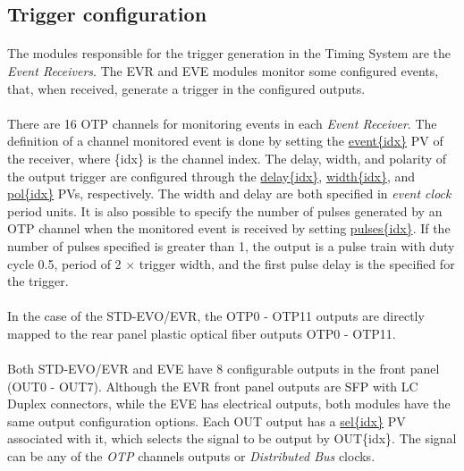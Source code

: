 \documentclass[openany]{article}
\begin{document}
	\subsection{Trigger configuration}
		\paragraph{} The modules responsible for the trigger generation in the Timing System are the \emph{Event 
Receivers}. The EVR and EVE modules monitor some configured events, that, when received, generate a trigger in the configured outputs.
		\paragraph{} There are 16 OTP channels for monitoring events in each \emph{Event Receiver}. The definition of a channel monitored event is done by setting the \hyperref[pvgroup:evre-otp]{event\{idx\}} PV of the receiver, where \{idx\} is the channel index. The delay, width, and polarity of the output trigger are configured through the \hyperref[pvgroup:evre-otp]{delay\{idx\}}, \hyperref[pvgroup:evre-otp]{width\{idx\}}, and \hyperref[pvgroup:evre-otp]{pol\{idx\}} PVs, respectively. The width and delay are both specified in \emph{event clock} period units. It is also possible to specify the number of pulses generated by an OTP channel when the monitored event is received by setting \hyperref[pvgroup:evre-otp]{pulses\{idx\}}. If the number of pulses specified is greater than 1, the output is a pulse train with duty cycle 0.5, period of 2 $\times$ trigger width, and the first pulse delay is the specified for the trigger.
		\paragraph{} In the case of the STD-EVO/EVR, the OTP0 - OTP11 outputs are directly mapped to the rear panel plastic optical fiber outputs OTP0 - OTP11.
		\paragraph{} Both STD-EVO/EVR and EVE have 8 configurable outputs in the front panel (OUT0 - OUT7). Although the EVR front panel outputs are SFP with LC Duplex connectors, while the EVE has electrical outputs, both modules have the same output configuration options. Each OUT output has a \hyperref[pvgroup:evre-out]{sel\{idx\}} PV associated with it, which selects the signal to be output by OUT\{idx\}. The signal can be any of the \emph{OTP} channels outputs or \emph{Distributed Bus} clocks.
\end{document}
